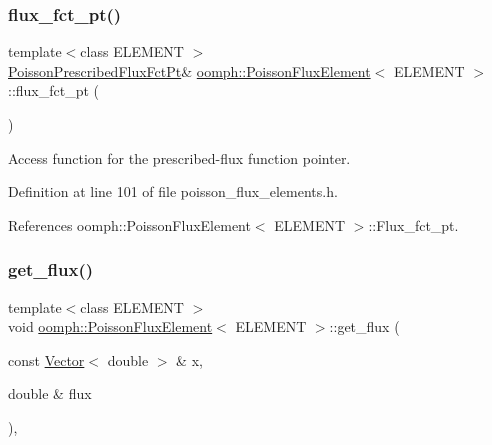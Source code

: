 \mbox{\label{classoomph_1_1PoissonFluxElement_a95afd87915bf4c678d4304cab9daa219}} 
\subsubsection{\texorpdfstring{flux\+\_\+fct\+\_\+pt()}{flux\_fct\_pt()}}
{\footnotesize\ttfamily template$<$class E\+L\+E\+M\+E\+NT $>$ \\
\hyperlink{classoomph_1_1PoissonFluxElement_a667254e1d7fea39ba393e0d9853f216d}{Poisson\+Prescribed\+Flux\+Fct\+Pt}\& \hyperlink{classoomph_1_1PoissonFluxElement}{oomph\+::\+Poisson\+Flux\+Element}$<$ E\+L\+E\+M\+E\+NT $>$\+::flux\+\_\+fct\+\_\+pt (\begin{DoxyParamCaption}{ }\end{DoxyParamCaption})\hspace{0.3cm}{\ttfamily [inline]}}



Access function for the prescribed-\/flux function pointer. 



Definition at line 101 of file poisson\+\_\+flux\+\_\+elements.\+h.



References oomph\+::\+Poisson\+Flux\+Element$<$ E\+L\+E\+M\+E\+N\+T $>$\+::\+Flux\+\_\+fct\+\_\+pt.

\mbox{\label{classoomph_1_1PoissonFluxElement_a51a332a35b271f1d61512ae66397aecb}} 
\subsubsection{\texorpdfstring{get\+\_\+flux()}{get\_flux()}}
{\footnotesize\ttfamily template$<$class E\+L\+E\+M\+E\+NT $>$ \\
void \hyperlink{classoomph_1_1PoissonFluxElement}{oomph\+::\+Poisson\+Flux\+Element}$<$ E\+L\+E\+M\+E\+NT $>$\+::get\+\_\+flux (\begin{DoxyParamCaption}\item[{const \hyperlink{classoomph_1_1Vector}{Vector}$<$ double $>$ \&}]{x,  }\item[{double \&}]{flux }\end{DoxyParamCaption})\hspace{0.3cm}{\ttfamily [inline]}, {\ttfamily [protected]}}

